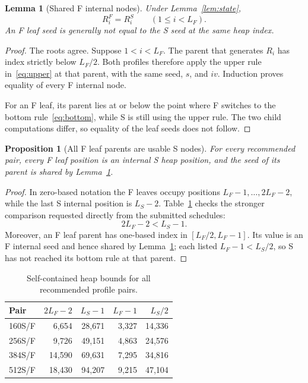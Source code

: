 \documentclass[11pt,a4paper]{article}
\newtheorem{lemma}[theorem]{Lemma}
\newtheorem{proposition}[theorem]{Proposition}
\begin{document}
\begin{lemma}[Shared F internal nodes]\label{lem:internal}
Under Lemma~\ref{lem:state},
\[
                    R_i^F=R_i^S\qquad(1\leq i<L_F).
\]
An F leaf seed is generally not equal to the S seed at the same heap index.
\end{lemma}
\begin{proof}
The roots agree.  Suppose $1<i<L_F$.  The parent that generates $R_i$ has
index strictly below $L_F/2$.  Both profiles therefore apply the upper rule
in~\eqref{eq:upper} at that parent, with the same seed, $s$, and $iv$.
Induction proves equality of every F internal node.

For an F leaf, its parent lies at or below the point where F switches to the
bottom rule~\eqref{eq:bottom}, while S is still using the upper rule.  The two
child computations differ, so equality of the leaf seeds does not follow.
\end{proof}

\begin{proposition}[All F leaf parents are usable S nodes]
\label{prop:bounds}
For every recommended pair, every F leaf position is an internal S heap
position, and the seed of its parent is shared by Lemma~\ref{lem:internal}.
\end{proposition}
\begin{proof}
In zero-based notation the F leaves occupy positions
$L_F-1,\ldots,2L_F-2$, while the last S internal position is $L_S-2$.
Table~\ref{tab:bounds} checks the stronger comparison requested directly from
the submitted schedules:
\[
                       2L_F-2<L_S-1.
\]
Moreover, an F leaf parent has one-based index in
$[L_F/2,L_F-1]$.  Its value is an F internal seed and hence shared by
Lemma~\ref{lem:internal}; each listed $L_F-1<L_S/2$, so S has not reached its
bottom rule at that parent.
\end{proof}

\begin{table}[ht]
\centering
\caption{Self-contained heap bounds for all recommended profile pairs.}
\label{tab:bounds}
\begin{tabular}{lrrrr}
\toprule
Pair & $2L_F-2$ & $L_S-1$ & $L_F-1$ & $L_S/2$\\
\midrule
160S/F & 6,654 & 28,671 & 3,327 & 14,336\\
256S/F & 9,726 & 49,151 & 4,863 & 24,576\\
384S/F & 14,590 & 69,631 & 7,295 & 34,816\\
512S/F & 18,430 & 94,207 & 9,215 & 47,104\\
\bottomrule
\end{tabular}
\end{table}
\end{document}
